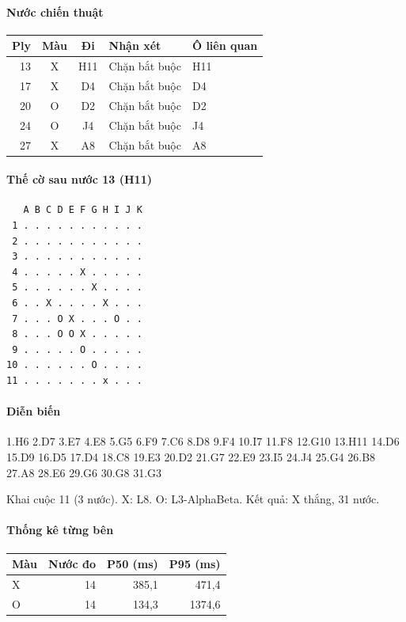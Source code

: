 \paragraph{Nước chiến thuật}
\begin{center}\small
\begin{tabular}{@{}rccll@{}}
\toprule
Ply & Màu & Đi & Nhận xét & Ô liên quan \\
\midrule
13 & X & H11 & Chặn bắt buộc & H11 \\
17 & X & D4 & Chặn bắt buộc & D4 \\
20 & O & D2 & Chặn bắt buộc & D2 \\
24 & O & J4 & Chặn bắt buộc & J4 \\
27 & X & A8 & Chặn bắt buộc & A8 \\
\bottomrule
\end{tabular}
\end{center}
\paragraph{Thế cờ sau nước 13 (H11)}
\begin{verbatim}
   A B C D E F G H I J K
 1 . . . . . . . . . . .
 2 . . . . . . . . . . .
 3 . . . . . . . . . . .
 4 . . . . . X . . . . .
 5 . . . . . . X . . . .
 6 . . X . . . . X . . .
 7 . . . O X . . . O . .
 8 . . . O O X . . . . .
 9 . . . . . O . . . . .
10 . . . . . . O . . . .
11 . . . . . . . x . . .
\end{verbatim}
\paragraph{Diễn biến}
{\footnotesize 1.H6 2.D7 3.E7 4.E8 5.G5 6.F9 7.C6 8.D8 9.F4 10.I7 11.F8 12.G10 13.H11 14.D6 15.D9 16.D5 17.D4 18.C8 19.E3 20.D2 21.G7 22.E9 23.I5 24.J4 25.G4 26.B8 27.A8 28.E6 29.G6 30.G8 31.G3\par}
Khai cuộc 11 (3 nước). X: L8. O: L3-AlphaBeta. Kết quả: X thắng, 31 nước.
\paragraph{Thống kê từng bên}
\begin{center}\small
\begin{tabular}{@{}lrrr@{}}
\toprule
Màu & Nước đo & P50 (ms) & P95 (ms) \\
\midrule
X & 14 & 385,1 & 471,4 \\
O & 14 & 134,3 & 1374,6 \\
\bottomrule
\end{tabular}
\end{center}
